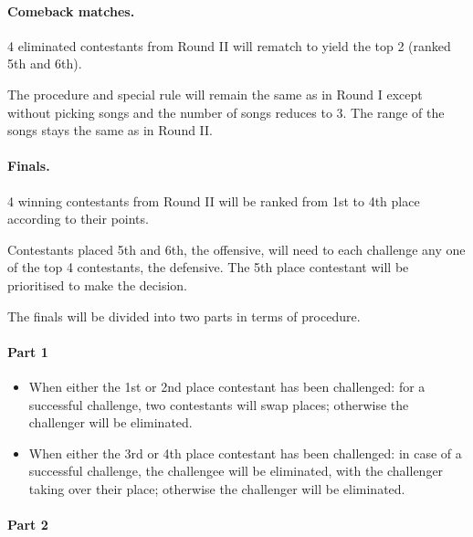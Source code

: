 \documentclass{article}
\newcommand{\srbgcolor}{red!40}
\begin{document}
\paragraph{Comeback matches.}
4 eliminated contestants
from Round II will rematch to yield the top 2
(ranked 5th and 6th).

The procedure and \colorbox{\srbgcolor}{special rule}
will remain the same as in Round I
except without picking songs
and the number of songs reduces to 3.
The range of the songs stays the same as in Round II.

\paragraph{Finals.}
4 winning contestants from Round II
will be ranked from 1st to 4th place
according to their points.

Contestants placed 5th and 6th, the offensive,
will need to each challenge any
one of the top 4 contestants, the defensive.
The 5th place contestant will be prioritised to make the decision.

The finals will be divided into two parts in terms of procedure.

\paragraph{Part 1}

\begin{itemize}
	\item When either the 1st or 2nd place contestant has been challenged:
	      for a successful challenge, two contestants will swap places;
	      otherwise the challenger will be eliminated.

	\item When either the 3rd or 4th place contestant has been challenged:
	      in case of a successful challenge,
	      the challengee  %
	      will be eliminated, with the challenger taking over  %
	      their place;
	      otherwise the challenger will be eliminated.
\end{itemize}

\paragraph{Part 2}
\end{document}
